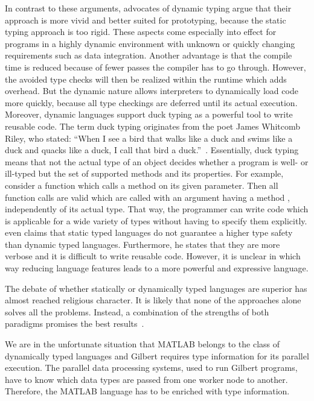In contrast to these arguments, advocates of dynamic typing argue that their approach is more vivid and better suited for prototyping, because the static typing approach is too rigid.
These aspects come especially into effect for programs in a highly dynamic environment with unknown or quickly changing requirements such as data integration.
Another advantage is that the compile time is reduced because of fewer passes the compiler has to go through.
However, the avoided type checks will then be realized within the runtime which adds overhead.
But the dynamic nature allows interpreters to dynamically load code more quickly, because all type checkings are deferred until its actual execution.
Moreover, dynamic languages support duck typing as a powerful tool to write reusable code.
The term duck typing originates from the poet James Whitcomb Riley, who stated: \enquote{When I see a bird that walks like a duck and swims like a duck and quacks like a duck, I call that bird a duck.}~\cite{heim:2007a}.
Essentially, duck typing means that not the actual type of an object decides whether a program is well- or ill-typed but the set of supported methods and its properties.
For example, consider a function which calls a method  on its given parameter.
Then all function calls are valid which are called with an argument having a method , independently of its actual type.
That way, the programmer can write code which is applicable for a wide variety of types without having to specify them explicitly.
\cite{ousterhout:c1998a} even claims that static typed languages do not guarantee a higher type safety than dynamic typed languages.
Furthermore, he states that they are more verbose and it is difficult to write reusable code.
However, it is unclear in which way reducing language features leads to a more powerful and expressive language. 

The debate of whether statically or dynamically typed languages are superior has almost reached religious character.
It is likely that none of the approaches alone solves all the problems.
Instead, a combination of the strengths of both paradigms promises the best results~\cite{meijer:2004a}.

We are in the unfortunate situation that MATLAB belongs to the class of dynamically typed languages and Gilbert requires type information for its parallel execution.
The parallel data processing systems, used to run Gilbert programs, have to know which data types are passed from one worker node to another.
Therefore, the MATLAB language has to be enriched with type information.

